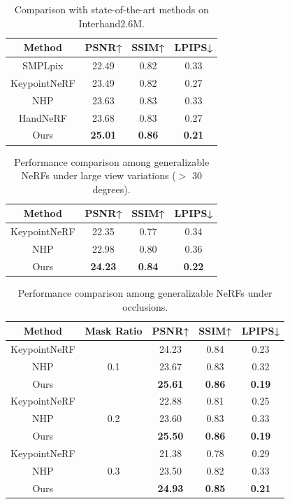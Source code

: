 \documentclass[letterpaper]{article} %
\begin{document}
\begin{table}[t]
    \caption{Comparison with state-of-the-art methods on Interhand2.6M.}
    \label{tab:Comparison}
    \centering
    \begin{tabular}{cccc}
        \toprule
        Method     & PSNR↑    & SSIM↑    & LPIPS↓     \\
        \midrule
        SMPLpix & 22.49 & 0.82 & 0.33 \\
        KeypointNeRF & 23.49   & 0.82  & 0.27   \\
        NHP & 23.63   & 0.83  & 0.33     \\ 
        HandNeRF & 23.68 & 0.83 & 0.27 \\ \hline
        Ours     &\textbf{25.01}   & \textbf{0.86}   & \textbf{0.21}  \\
        \bottomrule
    \end{tabular}
\end{table}

\begin{table}[t]
    \caption{Performance comparison among generalizable NeRFs under large view variations ($>$ 30 degrees).}
    \label{tab:quanti_view}
    \centering
    \begin{tabular}{cccc}
    \toprule
        Method     & PSNR↑    & SSIM↑    & LPIPS↓     \\
        \midrule
        KeypointNeRF & 22.35 & 0.77 & 0.34 \\
        NHP & 22.98 & 0.80 & 0.36 \\
        Ours & \textbf{24.23} & \textbf{0.84} & \textbf{0.22} \\
        \bottomrule
    \end{tabular}
\end{table}


\begin{table}[!t]
\centering
\caption{Performance comparison among generalizable NeRFs under occlusions.}
\label{tab:quanti_mask}
\small
\begin{tabular}{ccccc}
\toprule
Method  & Mask Ratio & PSNR↑    & SSIM↑    & LPIPS↓     \\
\midrule
KeypointNeRF & \multirow[c]{3}{*}{0.1} &  24.23  &  0.84  &  0.23  \\
NHP &  &  23.67   &  0.83   &  0.32     \\
Ours &  &  \textbf{25.61}    &  \textbf{0.86}     &  \textbf{0.19}      \\ \hline
KeypointNeRF & \multirow[c]{3}{*}{0.2} &  22.88  &   0.81   & 0.25      \\
NHP &  & 23.60 &  0.83   &     0.33   \\
Ours &  &   \textbf{25.50}   &  \textbf{0.86}    &   \textbf{0.19}   \\ \hline
KeypointNeRF & \multirow[c]{3}{*}{0.3} &  21.38  &   0.78   &     0.29  \\
NHP &  &  23.50   &   0.82  &   0.33    \\
Ours &  &   \textbf{24.93}    &  \textbf{0.85}     &  \textbf{0.21}  \\
\bottomrule
\end{tabular}
\end{table}
\end{document}

